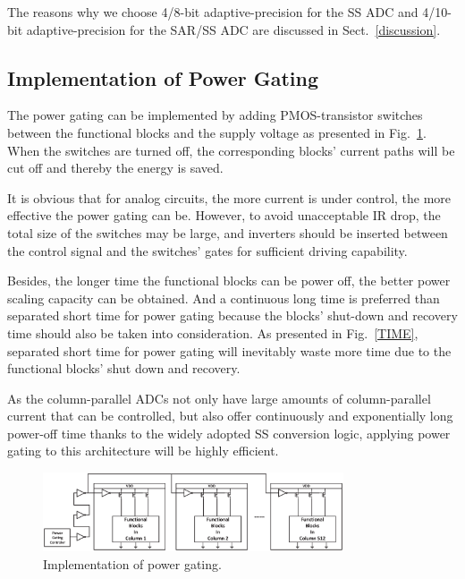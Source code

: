 The reasons why we choose 4/8-bit adaptive-precision for the SS ADC and 4/10-bit adaptive-precision for the SAR/SS ADC are discussed in Sect.~\ref{discussion}.


\subsection{Implementation of Power Gating}

The power gating can be implemented by adding PMOS-transistor switches between the functional blocks and the supply voltage \cite{keating_low_2007} as presented in Fig.~\ref{GATING}. 
When the switches are turned off, the corresponding blocks’ current paths will be cut off and thereby the energy is saved. 

It is obvious that for analog circuits, the more current is under control, the more effective the power gating can be. However, to avoid unacceptable IR drop, the total size of the switches may be large, 
and inverters should be inserted between the control signal and the switches’ gates for sufficient driving capability. 

Besides, the longer time the functional blocks can be power off, the better power scaling capacity can be obtained. And a continuous long time is preferred than separated short time for power gating because the blocks' shut-down and recovery time should also be taken into consideration.
As presented in Fig.~\ref{TIME}, separated short time for power gating will inevitably waste more
time due to the functional blocks' shut down and recovery. 

As the column-parallel ADCs not only have large amounts of column-parallel current that can be controlled, but also offer continuously and exponentially long power-off time thanks to the widely adopted SS conversion logic, applying power gating to this architecture will be highly efficient.

\begin{figure}[htbp]
	\centerline{\includegraphics[width=3.5in]{./Figures/GATING.eps}}
	\caption{Implementation of power gating.}
	\label{GATING}
\end{figure} 

